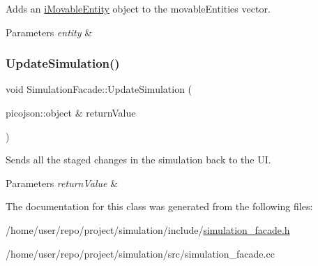 Adds an \hyperlink{classiMovableEntity}{i\+Movable\+Entity} object to the movable\+Entities vector. 


\begin{DoxyParams}{Parameters}
{\em entity} & \\
\hline
\end{DoxyParams}
\mbox{\label{classSimulationFacade_a62c5da57349073c3f472346dd273b03a}} 
\subsubsection{\texorpdfstring{Update\+Simulation()}{UpdateSimulation()}}
{\footnotesize\ttfamily void Simulation\+Facade\+::\+Update\+Simulation (\begin{DoxyParamCaption}\item[{picojson\+::object \&}]{return\+Value }\end{DoxyParamCaption})}



Sends all the staged changes in the simulation back to the UI. 


\begin{DoxyParams}{Parameters}
{\em return\+Value} & \\
\hline
\end{DoxyParams}


The documentation for this class was generated from the following files\+:\begin{DoxyCompactItemize}
\item 
/home/user/repo/project/simulation/include/\hyperlink{simulation__facade_8h}{simulation\+\_\+facade.\+h}\item 
/home/user/repo/project/simulation/src/simulation\+\_\+facade.\+cc\end{DoxyCompactItemize}
